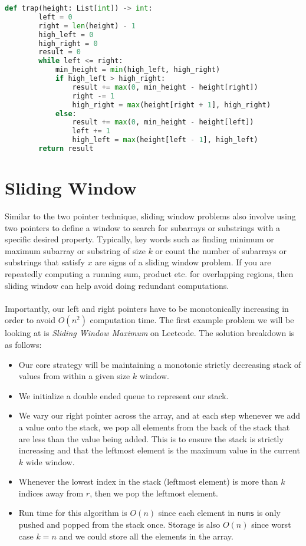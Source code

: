 \begin{lstlisting}[language=Python, caption=Trapping Rain Water]
    def trap(height: List[int]) -> int:
        left = 0
        right = len(height) - 1
        high_left = 0
        high_right = 0
        result = 0
        while left <= right:
            min_height = min(high_left, high_right)
            if high_left > high_right:
                result += max(0, min_height - height[right])
                right -= 1
                high_right = max(height[right + 1], high_right)
            else:
                result += max(0, min_height - height[left])
                left += 1
                high_left = max(height[left - 1], high_left)
        return result
\end{lstlisting}

\section{Sliding Window}
Similar to the two pointer technique, sliding window problems also involve using two pointers to define a window
to search for subarrays or substrings with a specific desired property. Typically, key words such as finding minimum
or maximum subarray or substring of size $k$ or count the number of subarrays or substrings that satisfy $x$ are signs
of a sliding window problem. If you are repeatedly computing a running sum, product etc. for overlapping regions, then
sliding window can help avoid doing redundant computations.\\
\\
Importantly, our left and right pointers have to be monotonically increasing in order to avoid $O(n^2)$ computation time.
The first example problem we will be looking at is \textit{Sliding Window Maximum} on Leetcode. The solution breakdown is as follows:

\begin{itemize}
    \item Our core strategy will be maintaining a monotonic strictly decreasing stack of values from within a given size $k$ window.
    \item We initialize a double ended queue to represent our stack. 
    \item We vary our right pointer across the array, and at each step whenever we add a value onto the stack, we pop all elements 
          from the back of the stack that are less than the value being added. This is to ensure the stack is strictly increasing and that
          the leftmost element is the maximum value in the current $k$ wide window.
    \item Whenever the lowest index in the stack (leftmost element) is more than $k$ indices away from $r$, then we pop the leftmost element.
    \item Run time for this algorithm is $O(n)$ since each element in \texttt{nums} is only pushed and popped from the stack once. Storage is 
          also $O(n)$ since worst case $k = n$ and we could store all the elements in the array.
\end{itemize}

